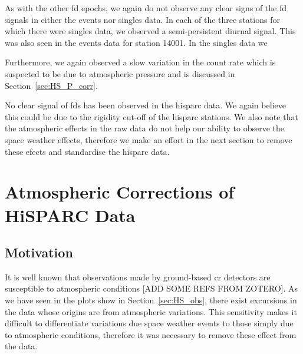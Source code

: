 As with the other \gls{fd} epochs, we again do not observe any clear signs of the \gls{fd} signals in either the events nor singles data. In each of the three stations for which there were singles data, we observed a semi-persistent diurnal signal. This was also seen in the events data for station 14001. In the singles data we 

Furthermore, we again observed a slow variation in the count rate which is suspected to be due to atmospheric pressure and is discussed in Section~\ref{sec:HS_P_corr}.

No clear signal of \glspl{fd} has been observed in the \gls{hisparc} data. We again believe this could be due to the rigidity cut-off of the \gls{hisparc} stations. We also note that the atmospheric effects in the raw data do not help our ability to observe the space weather effects, therefore we make an effort in the next section to remove these efects and standardise the \gls{hisparc} data. 




\section{Atmospheric Corrections of HiSPARC Data}\label{sec:HS_standardisation}

\subsection{Motivation}

It is well known that observations made by ground-based \gls{cr} detectors are susceptible to atmospheric conditions [ADD SOME REFS FROM ZOTERO]. As we have seen in the plots show in Section~\ref{sec:HS_obs}, there exist excursions in the data whose origins are from atmospheric variations. This sensitivity makes it difficult to differentiate variations due space weather events to those simply due to atmospheric conditions, therefore it was necessary to remove these effect from the data.



